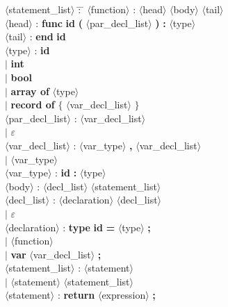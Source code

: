 \newcommand{\IS}{:}
\newcommand{\OR}{$|$}
\newcommand{\T}[1]{{\bf #1}}
\newcommand{\NT}[1]{$\langle$#1$\rangle$}

\begin{figure}[htp]
\begin{center}
\begin{tabbing}
\NT{statement\_list} \=: \=\kill
\NT{function}        \> \IS \> \NT{head} \NT{body} \NT{tail} \\
\NT{head}            \> \IS \> \T{func} \T{id} \T{(} \NT{par\_decl\_list}
                               \T{)} \T{:} \NT{type} \\
\NT{tail}            \> \IS \> \T{end} \T{id} \\
\NT{type}            \> \IS \> \T{id} \\
                     \> \OR \> \T{int} \\
                     \> \OR \> \T{bool} \\
                     \> \OR \> \T{array of} \NT{type} \\
                     \> \OR \> \T{record of} \T{$\mathbf{\{}$}
                               \NT{var\_decl\_list} \T{$\mathbf{\}}$} \\
\NT{par\_decl\_list} \> \IS \> \NT{var\_decl\_list} \\
                     \> \OR \> $\varepsilon$ \\
\NT{var\_decl\_list} \> \IS \> \NT{var\_type} \T{,}
                               \NT{var\_decl\_list} \\
                     \> \OR \> \NT{var\_type} \\
\NT{var\_type}       \> \IS \> \T{id} \T{:} \NT{type} \\
\NT{body}            \> \IS \> \NT{decl\_list} \NT{statement\_list} \\
\NT{decl\_list}      \> \IS \> \NT{declaration} \NT{decl\_list} \\
                     \> \OR \> $\varepsilon$ \\
\NT{declaration}     \> \IS \> \T{type} \T{id} \T{=} \NT{type} \T{;} \\
                     \> \OR \> \NT{function} \\
                     \> \OR \> \T{var} \NT{var\_decl\_list} \T{;} \\
\NT{statement\_list} \> \IS \> \NT{statement} \\
                     \> \OR \> \NT{statement} \NT{statement\_list} \\
\NT{statement}       \> \IS \> \T{return} \NT{expression} \T{;} \\

\end{tabbing}
\end{center}
\end{figure}
